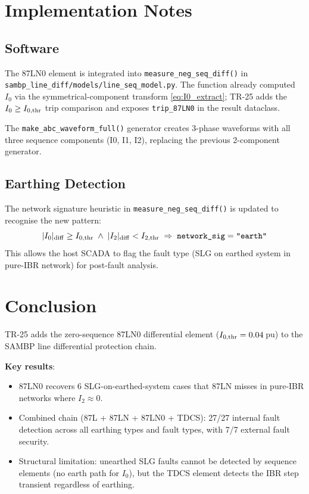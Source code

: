 \documentclass[11pt,a4paper]{article}
\begin{document}
\section{Implementation Notes}

\subsection{Software}

The 87LN0 element is integrated into \texttt{measure\_neg\_seq\_diff()} in
\texttt{sambp\_line\_diff/models/line\_seq\_model.py}.  The function already
computed $I_0$ via the symmetrical-component transform
\eqref{eq:I0_extract}; TR-25 adds the $I_0 \geq I_{0,\rm thr}$ trip
comparison and exposes \texttt{trip\_87LN0} in the result dataclass.

The \texttt{make\_abc\_waveform\_full()} generator creates 3-phase waveforms
with all three sequence components (I0, I1, I2), replacing the previous
2-component generator.

\subsection{Earthing Detection}

The network signature heuristic in \texttt{measure\_neg\_seq\_diff()} is
updated to recognise the new pattern:
\begin{equation}
  |I_0|_{\rm diff} \geq I_{0,\rm thr} \;\wedge\;
  |I_2|_{\rm diff} < I_{2,\rm thr}
  \;\Rightarrow\; \texttt{network\_sig} = \texttt{"earth"}
\end{equation}
This allows the host SCADA to flag the fault type (SLG on earthed system in
pure-IBR network) for post-fault analysis.

\section{Conclusion}

TR-25 adds the zero-sequence 87LN0 differential element
($I_{0,\rm thr} = 0.04$\,pu) to the SAMBP line differential protection chain.

\textbf{Key results}:
\begin{itemize}
  \item 87LN0 recovers 6 SLG-on-earthed-system cases that 87LN misses in
    pure-IBR networks where $I_2 \approx 0$.
  \item Combined chain (87L + 87LN + 87LN0 + TDCS): 27/27 internal fault
    detection across all earthing types and fault types, with 7/7 external
    fault security.
  \item Structural limitation: unearthed SLG faults cannot be detected by
    sequence elements (no earth path for $I_0$), but the TDCS element
    detects the IBR step transient regardless of earthing.
\end{itemize}
\end{document}
